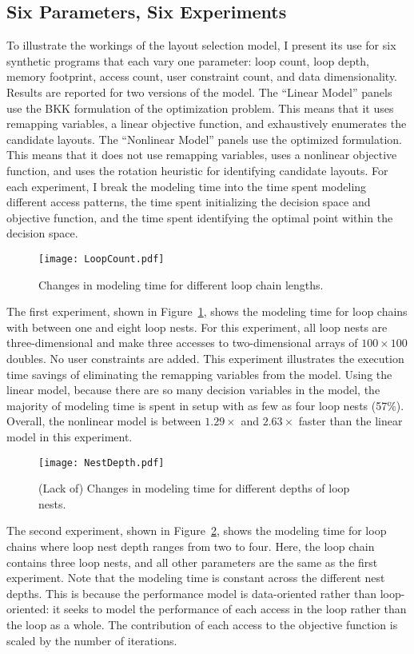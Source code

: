 \subsection{Six Parameters, Six Experiments}

To illustrate the workings of the layout selection model, I present its use for six synthetic programs that each vary one parameter: loop count, loop depth, memory footprint, access count, user constraint count, and data dimensionality.
Results are reported for two versions of the model.
The ``Linear Model'' panels use the BKK formulation of the optimization problem.
This means that it uses remapping variables, a linear objective function, and exhaustively enumerates the candidate layouts.
The ``Nonlinear Model'' panels use the optimized \FormatDecisions{} formulation.
This means that it does not use remapping variables, uses a nonlinear objective function, and uses the rotation heuristic for identifying candidate layouts.
For each experiment, I break the modeling time into the time spent modeling different access patterns, the time spent initializing the decision space and objective function, and the time spent identifying the optimal point within the decision space. 

\begin{figure}
\texttt{[image: LoopCount.pdf]}
\caption{Changes in modeling time for different loop chain lengths.}\label{LoopCount}
\end{figure}
The first experiment, shown in Figure~\ref{LoopCount}, shows the modeling time for loop chains with between one and eight loop nests.
For this experiment, all loop nests are three-dimensional and make three accesses to two-dimensional arrays of $100\times100$ doubles. 
No user constraints are added.
This experiment illustrates the execution time savings of eliminating the remapping variables from the model.
Using the linear model, because there are so many decision variables in the model, the majority of modeling time is spent in setup with as few as four loop nests (57\%).
Overall, the nonlinear model is between $1.29\times$ and $2.63\times$ faster than the linear model in this experiment.

\begin{figure}
	\texttt{[image: NestDepth.pdf]}
	\caption{(Lack of) Changes in modeling time for different depths of loop nests.}\label{NestDepth}
\end{figure}
The second experiment, shown in Figure~\ref{NestDepth}, shows the modeling time for loop chains where loop nest depth ranges from two to four.
Here, the loop chain contains three loop nests, and all other parameters are the same as the first experiment.
Note that the modeling time is constant across the different nest depths. 
This is because the performance model is data-oriented rather than loop-oriented: it seeks to model the performance of each access in the loop rather than the loop as a whole.
The contribution of each access to the objective function is scaled by the number of iterations.

